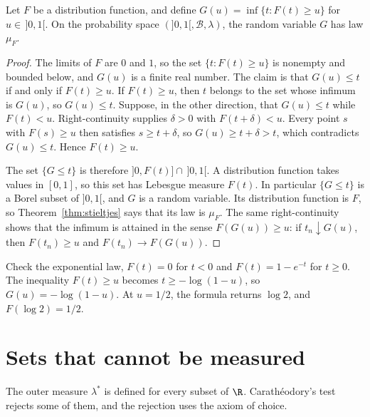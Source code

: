 \begin{proposition}\label{prop:quantile}
Let $F$ be a distribution function, and define $G(u)=\inf\{t:F(t)\ge u\}$ for $u\in\,]0,1[$.
On the probability space $(]0,1[,\mathcal B,\lambda)$, the random variable $G$ has law $\mu_F$.
\end{proposition}
\begin{proof}
The limits of $F$ are $0$ and $1$, so the set $\{t:F(t)\ge u\}$ is nonempty and bounded below, and $G(u)$ is a finite real number.
The claim is that $G(u)\le t$ if and only if $F(t)\ge u$.
If $F(t)\ge u$, then $t$ belongs to the set whose infimum is $G(u)$, so $G(u)\le t$.
Suppose, in the other direction, that $G(u)\le t$ while $F(t)<u$.
Right-continuity supplies $\delta>0$ with $F(t+\delta)<u$.
Every point $s$ with $F(s)\ge u$ then satisfies $s\ge t+\delta$, so $G(u)\ge t+\delta>t$, which contradicts $G(u)\le t$.
Hence $F(t)\ge u$.

The set $\{G\le t\}$ is therefore $]0,F(t)]\cap\,]0,1[$.
A distribution function takes values in $[0,1]$, so this set has Lebesgue measure $F(t)$.
In particular $\{G\le t\}$ is a Borel subset of $]0,1[$, and $G$ is a random variable.
Its distribution function is $F$, so Theorem~\ref{thm:stieltjes} says that its law is $\mu_F$.
The same right-continuity shows that the infimum is attained in the sense $F(G(u))\ge u$: if $t_n\downarrow G(u)$, then $F(t_n)\ge u$ and $F(t_n)\to F(G(u))$.
\end{proof}

Check the exponential law, $F(t)=0$ for $t<0$ and $F(t)=1-e^{-t}$ for $t\ge0$.
The inequality $F(t)\ge u$ becomes $t\ge-\log(1-u)$, so $G(u)=-\log(1-u)$.
At $u=1/2$, the formula returns $\log 2$, and $F(\log 2)=1/2$.

\section{Sets that cannot be measured}

The outer measure $\lambda^*$ is defined for every subset of $\R$.
Carath\'eodory's test rejects some of them, and the rejection uses the axiom of choice.

